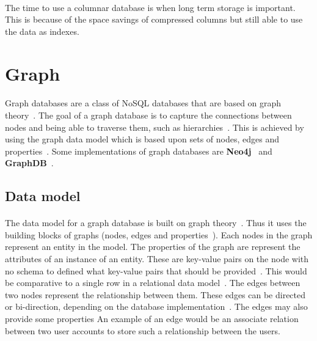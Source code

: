 \documentclass{CRPITStyle}
\renewcommand{\cite}{\citep}
\begin{document}
\paragraph{}
The time to use a columnar database is when long term storage is important.
This is because of the space savings of compressed columns but still able
to use the data as indexes.


\section{Graph}

\paragraph{}
Graph databases are a class of NoSQL databases that are based on graph
theory~\cite{nosql_survey,sql_nosql}.
The goal of a graph database is to capture the connections between
nodes and being able to traverse them,
such as hierarchies~\cite{type_nosql}.
This is achieved by using the graph data model which is based upon 
sets of nodes, edges and properties~\cite{nosql_survey,sql_nosql}.
Some implementations of graph databases are \textbf{Neo4j}~\cite{neo4j}
and \textbf{GraphDB}~\cite{graphdb}.

\subsection{Data model}

\paragraph{}
The data model for a graph database is built on graph
theory~\cite{nosql_survey,sql_nosql,graphdb}.
Thus it uses the building blocks of graphs (nodes, edges and
properties~\cite{graphdb}).
Each nodes in the graph represent an entity in the model.
The properties of the graph are represent the attributes of 
an instance of an entity.
These are key-value pairs on the node with no schema to defined what
key-value pairs that should be provided~\cite{neo4j}.
This would be comparative to a single row in a relational data
model~\cite{relational_db}.
The edges between two nodes represent the relationship between
them.
These edges can be directed or bi-direction, depending on the database
implementation~\cite{graphdb,neo4j}.
The edges may also provide some properties
An example of an edge would be an associate relation between two user accounts
to store such a relationship between the users.
\end{document}
